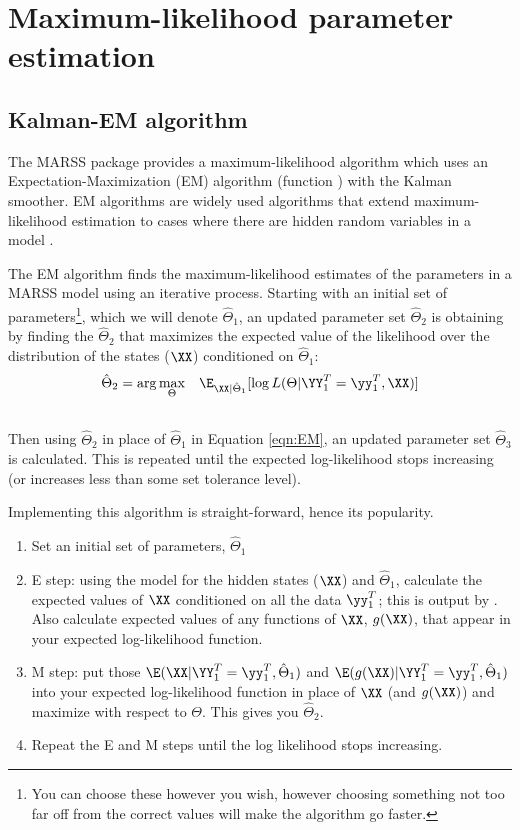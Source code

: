 \section{Maximum-likelihood parameter estimation}

\subsection{Kalman-EM algorithm}

The MARSS package provides a maximum-likelihood algorithm which uses an Expectation-Maximization (EM) algorithm (function \verb@MARSSkem@{}) with the Kalman smoother.  EM algorithms are widely used algorithms that extend maximum-likelihood estimation to cases where there are hidden random variables in a model 
\citep{Dempsteretal1977, Harvey1989, HarveyShephard1993, McLachlanKrishnan2008}.  

The EM algorithm finds the maximum-likelihood estimates of the parameters in a MARSS model using an iterative process.  Starting with an initial set of parameters\footnote{You can choose these however you wish, however choosing something not too far off from the correct values will make the algorithm go faster.}, which we will denote $\hat{\Theta}_1$, an updated parameter set $\hat{\Theta}_2$ is obtaining by finding the $\hat{\Theta}_2$ that maximizes the expected value of the likelihood over the distribution of the states ($\XX$) conditioned on $\hat{\Theta}_1$:
\begin{align}\label{eqn:EM}
	\hat{\Theta}_2 &= \arg\underset{\Theta}{\max} \quad \E_{\XX|\hat{\Theta}_1}[\log L(\Theta |\YY_1^T=\yy_1^T,\XX)]\\
\nonumber
\end{align}
Then using $\hat{\Theta}_2$ in place of $\hat{\Theta}_1$ in Equation \eqref{eqn:EM}, an updated parameter set $\hat{\Theta}_3$ is calculated.  This is repeated until the expected log-likelihood stops increasing (or increases less than some set tolerance level).

Implementing this algorithm is straight-forward, hence its popularity.
\begin{enumerate}
	\item Set an initial set of parameters, $\hat{\Theta}_1$
	\item E step: using the model for the hidden states ($\XX$) and $\hat{\Theta}_1$, calculate the expected values of $\XX$ conditioned on all the data $\yy_1^T$; this is \verb@xtT@ output by \verb@MARSSkf@.  Also calculate expected values of any functions of $\XX$, $g(\XX)$, that appear in your expected log-likelihood function.
	\item M step: put those $\E(\XX | \YY_1^T=\yy_1^T, \hat{\Theta}_1)$ and $\E(g(\XX) | \YY_1^T=\yy_1^T, \hat{\Theta}_1)$ into your expected log-likelihood function in place of $\XX$ (and $g(\XX)$) and maximize with respect to $\Theta$.  This gives you $\hat{\Theta}_2$.
	\item Repeat the E and M steps until the log likelihood stops increasing.
\end{enumerate}

